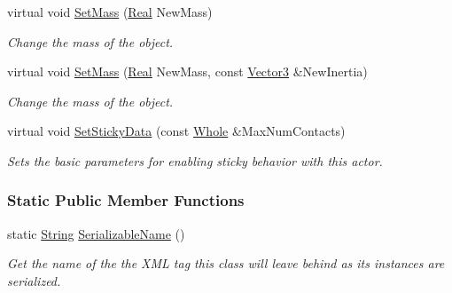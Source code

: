 \begin{DoxyCompactItemize}
virtual void \hyperlink{classMezzanine_1_1ActorRigidPhysicsSettings_a9b2ed9808e7b4a7c8874f33c51fb8ca1}{Set\-Mass} (\hyperlink{namespaceMezzanine_a726731b1a7df72bf3583e4a97282c6f6}{Real} New\-Mass)
\begin{DoxyCompactList}\small\item\em Change the mass of the object. \end{DoxyCompactList}\item 
virtual void \hyperlink{classMezzanine_1_1ActorRigidPhysicsSettings_a8c2a5d88f76478a1d1ba4c194ad5d886}{Set\-Mass} (\hyperlink{namespaceMezzanine_a726731b1a7df72bf3583e4a97282c6f6}{Real} New\-Mass, const \hyperlink{classMezzanine_1_1Vector3}{Vector3} \&New\-Inertia)
\begin{DoxyCompactList}\small\item\em Change the mass of the object. \end{DoxyCompactList}\item 
virtual void \hyperlink{classMezzanine_1_1ActorRigidPhysicsSettings_a2c090930426361a573ba939ac9580bce}{Set\-Sticky\-Data} (const \hyperlink{namespaceMezzanine_adcbb6ce6d1eb4379d109e51171e2e493}{Whole} \&Max\-Num\-Contacts)
\begin{DoxyCompactList}\small\item\em Sets the basic parameters for enabling sticky behavior with this actor. \end{DoxyCompactList}\end{DoxyCompactItemize}
\subsubsection*{Static Public Member Functions}
\begin{DoxyCompactItemize}
\item 
static \hyperlink{namespaceMezzanine_acf9fcc130e6ebf08e3d8491aebcf1c86}{String} \hyperlink{classMezzanine_1_1ActorRigidPhysicsSettings_a8dab39e71eb26175a3cb4bbb3966c9b1}{Serializable\-Name} ()
\begin{DoxyCompactList}\small\item\em Get the name of the the X\-M\-L tag this class will leave behind as its instances are serialized. \end{DoxyCompactList}\end{DoxyCompactItemize}
